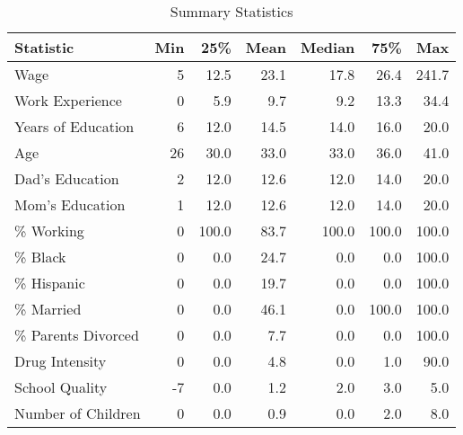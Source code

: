 \begin{table}

\caption{Summary Statistics}
\centering
\begin{tabular}[t]{lrrrrrr}
\toprule
Statistic & Min & 25\% & Mean & Median & 75\% & Max\\
\midrule
Wage & 5 & 12.5 & 23.1 & 17.8 & 26.4 & 241.7\\
Work Experience & 0 & 5.9 & 9.7 & 9.2 & 13.3 & 34.4\\
Years of Education & 6 & 12.0 & 14.5 & 14.0 & 16.0 & 20.0\\
Age & 26 & 30.0 & 33.0 & 33.0 & 36.0 & 41.0\\
Dad's Education & 2 & 12.0 & 12.6 & 12.0 & 14.0 & 20.0\\
\addlinespace
Mom's Education & 1 & 12.0 & 12.6 & 12.0 & 14.0 & 20.0\\
\% Working & 0 & 100.0 & 83.7 & 100.0 & 100.0 & 100.0\\
\% Black & 0 & 0.0 & 24.7 & 0.0 & 0.0 & 100.0\\
\% Hispanic & 0 & 0.0 & 19.7 & 0.0 & 0.0 & 100.0\\
\% Married & 0 & 0.0 & 46.1 & 0.0 & 100.0 & 100.0\\
\addlinespace
\% Parents Divorced & 0 & 0.0 & 7.7 & 0.0 & 0.0 & 100.0\\
Drug Intensity & 0 & 0.0 & 4.8 & 0.0 & 1.0 & 90.0\\
School Quality & -7 & 0.0 & 1.2 & 2.0 & 3.0 & 5.0\\
Number of Children & 0 & 0.0 & 0.9 & 0.0 & 2.0 & 8.0\\
\bottomrule
\end{tabular}
\end{table}

